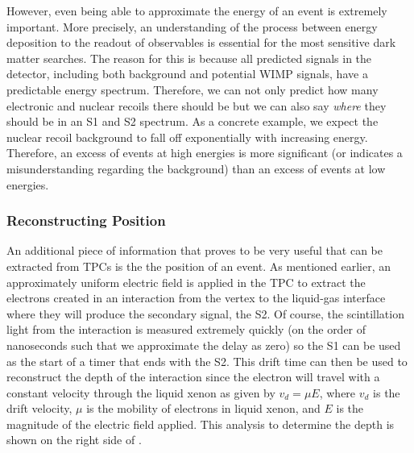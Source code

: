 However, even being able to approximate the energy of an event is extremely important.  More precisely, an understanding of the process between energy deposition to the readout of observables is essential for the most sensitive dark matter searches.  The reason for this is because all predicted signals in the detector, including both background and potential WIMP signals, have a predictable energy spectrum.  Therefore, we can not only predict how many electronic and nuclear recoils there should be but we can also say \textit{where} they should be in an S1 and S2 spectrum.  As a concrete example, we expect the nuclear recoil background to fall off exponentially with increasing energy.  Therefore, an excess of events at high energies is more significant (or indicates a misunderstanding regarding the background) than an excess of events at low energies.


\subsubsection{Reconstructing Position}
\label{sec:xe_pos_rec}

An additional piece of information that proves to be very useful that can be extracted from TPCs is the the position of an event.  As mentioned earlier, an approximately uniform electric field is applied in the TPC to extract the electrons created in an interaction from the vertex to the liquid-gas interface where they will produce the secondary signal, the S2.  Of course, the scintillation light from the interaction is measured extremely quickly (on the order of nanoseconds such that we approximate the delay as zero) so the S1 can be used as the start of a timer that ends with the S2.  This drift time can then be used to reconstruct the depth of the interaction since the electron will travel with a constant velocity through the liquid xenon as given by $v_d = \mu E$, where $v_d$ is the drift velocity, $\mu$ is the mobility of electrons in liquid xenon, and $E$ is the magnitude of the electric field applied.   This analysis to determine the depth is shown on the right side of .

